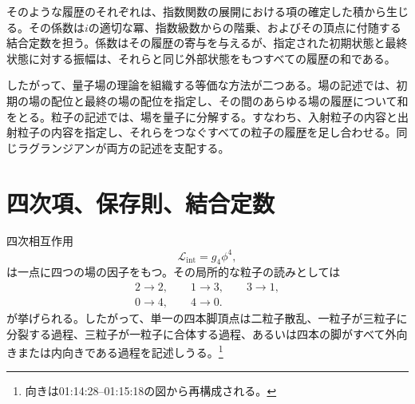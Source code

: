 そのような履歴のそれぞれは、指数関数の展開における項の確定した積から生じる。その係数は\(i\)の適切な冪、指数級数からの階乗、およびその頂点に付随する結合定数を担う。係数はその履歴の寄与を与えるが、指定された初期状態と最終状態に対する振幅は、それらと同じ外部状態をもつすべての履歴の和である。

\begin{classroomqa}
\end{classroomqa}

したがって、量子場の理論を組織する等価な方法が二つある。場の記述では、初期の場の配位と最終の場の配位を指定し、その間のあらゆる場の履歴について和をとる。粒子の記述では、場を量子に分解する。すなわち、入射粒子の内容と出射粒子の内容を指定し、それらをつなぐすべての粒子の履歴を足し合わせる。同じラグランジアンが両方の記述を支配する。

\section{四次項、保存則、結合定数}

四次相互作用
\begin{equation}
\mathcal{L}_{\mathrm{int}}=g_4\phi^4,
\end{equation}
は一点に四つの場の因子をもつ。その局所的な粒子の読みとしては
\begin{equation}
\begin{gathered}
2\longrightarrow2,
\qquad
1\longrightarrow3,
\qquad
3\longrightarrow1,\\
0\longrightarrow4,
\qquad
4\longrightarrow0.
\end{gathered}
\end{equation}
が挙げられる。したがって、単一の四本脚頂点は二粒子散乱、一粒子が三粒子に分裂する過程、三粒子が一粒子に合体する過程、あるいは四本の脚がすべて外向きまたは内向きである過程を記述しうる。\footnote{向きは01:14:28--01:15:18の図から再構成される。}

